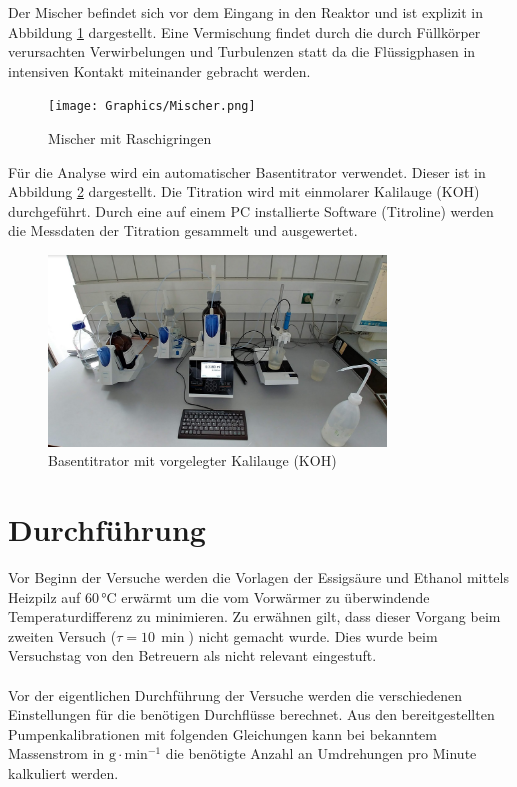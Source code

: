 \documentclass[12pt,liststotoc]{report}
\begin{document}
Der Mischer befindet sich vor dem Eingang in den Reaktor und ist explizit in Abbildung \ref{Mischer} dargestellt. Eine Vermischung findet durch die durch Füllkörper verursachten Verwirbelungen und Turbulenzen statt da die Flüssigphasen in intensiven Kontakt miteinander gebracht werden. 

\begin{figure}[H]
\centering
\texttt{[image: Graphics/Mischer.png]} 
\caption{Mischer mit Raschigringen}
\label{Mischer}
\end{figure}
\noindent

Für die Analyse wird ein automatischer Basentitrator verwendet. Dieser ist in Abbildung \ref{Basentitrator} dargestellt. Die Titration wird mit einmolarer Kalilauge (KOH) durchgeführt. Durch eine auf einem PC installierte Software (Titroline) werden die Messdaten der Titration gesammelt und ausgewertet.

\begin{figure}[H]
\centering
\includegraphics[width=0.8\textwidth]{Graphics/Auto-Basentitrator.PNG} 
\caption[Basentitrator mit vorgelegter Kalilauge]{Basentitrator mit vorgelegter Kalilauge (KOH)}
\label{Basentitrator}
\end{figure}
\noindent


\chapter{Durchführung}

Vor Beginn der Versuche werden die Vorlagen der Essigsäure und Ethanol mittels Heizpilz auf 60\,$\text{°C}$ erwärmt um die vom Vorwärmer zu überwindende Temperaturdifferenz zu minimieren. Zu erwähnen gilt, dass dieser Vorgang beim zweiten Versuch ($\tau = 10\,\min$) nicht gemacht wurde. Dies wurde beim Versuchstag von den Betreuern als nicht relevant eingestuft. 
\\
\\
Vor der eigentlichen Durchführung der Versuche werden die verschiedenen Einstellungen für die benötigen Durchflüsse berechnet. Aus den bereitgestellten Pumpenkalibrationen mit folgenden Gleichungen kann bei bekanntem Massenstrom in $\text{g}\cdot \text{min}^{-1}$ die benötigte Anzahl an Umdrehungen pro Minute kalkuliert werden.
\end{document}
